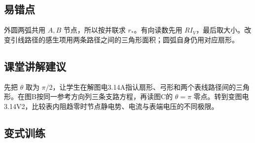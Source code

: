 \documentclass[UTF8,fontset=fandol,a4paper,11pt]{ctexart}
\begin{document}


\subsection*{易错点}

外圆两弧共用 $A,B$ 节点，所以按并联求 $r_*$。有向读数先用 $RI_V$，最后取大小。改变引线路径的感生项用两条路径之间的三角形面积；圆弧自身仍用对应扇形。



\subsection*{课堂讲解建议}

先把 $\theta$ 取为 $\pi/2$，让学生在解图电3.14A指认扇形、弓形和两个表线路径间的三角形。在图B按同一参考方向列三条支路方程，再读图C的 $\theta=\pi$ 零点。转到变图电3.14V2，比较表内阻趋零时节点静电势、电流与表端电压的不同极限。


\subsection*{变式训练}
\end{document}
